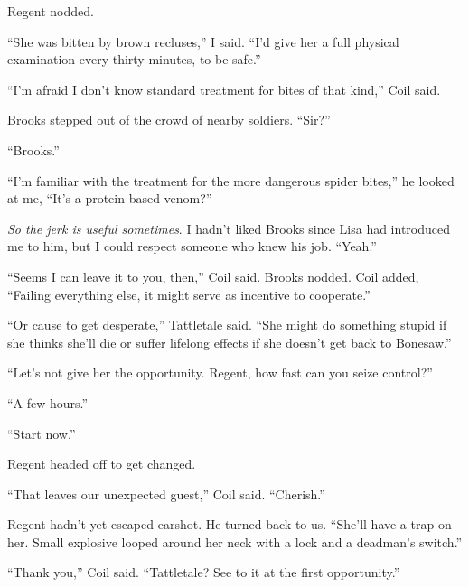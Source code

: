 Regent nodded.



``She was bitten by brown recluses,'' I said.  ``I'd give her a full physical examination every thirty minutes, to be safe.''



``I'm afraid I don't know standard treatment for bites of that kind,'' Coil said.



Brooks stepped out of the crowd of nearby soldiers.  ``Sir?''



``Brooks.''



``I'm familiar with the treatment for the more dangerous spider bites,'' he looked at me, ``It's a protein-based venom?''



\emph{So the jerk is useful sometimes}.  I hadn't liked Brooks since Lisa had introduced me to him, but I could respect someone who knew his job.  ``Yeah.''



``Seems I can leave it to you, then,'' Coil said.  Brooks nodded.  Coil added, ``Failing everything else, it might serve as incentive to cooperate.''



``Or cause to get desperate,'' Tattletale said.  ``She might do something stupid if she thinks she'll die or suffer lifelong effects if she doesn't get back to Bonesaw.''



``Let's not give her the opportunity.  Regent, how fast can you seize control?''



``A few hours.''



``Start now.''



Regent headed off to get changed.



``That leaves our unexpected guest,'' Coil said.  ``Cherish.''



Regent hadn't yet escaped earshot.  He turned back to us.  ``She'll have a trap on her.  Small explosive looped around her neck with a lock and a deadman's switch.''



``Thank you,'' Coil said.  ``Tattletale?  See to it at the first opportunity.''



